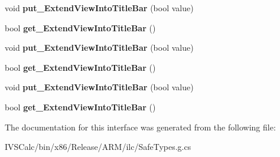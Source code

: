 \begin{DoxyCompactItemize}
void {\bfseries put\+\_\+\+Extend\+View\+Into\+Title\+Bar} (bool value)
\item 
\mbox{\label{interface_windows_1_1_application_model_1_1_core_1_1_i_core_application_view_title_bar_a4fbd4def95c784d83117d955369996d6}} 
bool {\bfseries get\+\_\+\+Extend\+View\+Into\+Title\+Bar} ()
\item 
\mbox{\label{interface_windows_1_1_application_model_1_1_core_1_1_i_core_application_view_title_bar_a7a2a4e4f4defc497bd88c834148e4602}} 
void {\bfseries put\+\_\+\+Extend\+View\+Into\+Title\+Bar} (bool value)
\item 
\mbox{\label{interface_windows_1_1_application_model_1_1_core_1_1_i_core_application_view_title_bar_a4fbd4def95c784d83117d955369996d6}} 
bool {\bfseries get\+\_\+\+Extend\+View\+Into\+Title\+Bar} ()
\item 
\mbox{\label{interface_windows_1_1_application_model_1_1_core_1_1_i_core_application_view_title_bar_a7a2a4e4f4defc497bd88c834148e4602}} 
void {\bfseries put\+\_\+\+Extend\+View\+Into\+Title\+Bar} (bool value)
\item 
\mbox{\label{interface_windows_1_1_application_model_1_1_core_1_1_i_core_application_view_title_bar_a4fbd4def95c784d83117d955369996d6}} 
bool {\bfseries get\+\_\+\+Extend\+View\+Into\+Title\+Bar} ()
\end{DoxyCompactItemize}


The documentation for this interface was generated from the following file\+:\begin{DoxyCompactItemize}
\item 
I\+V\+S\+Calc/bin/x86/\+Release/\+A\+R\+M/ilc/Safe\+Types.\+g.\+cs\end{DoxyCompactItemize}
